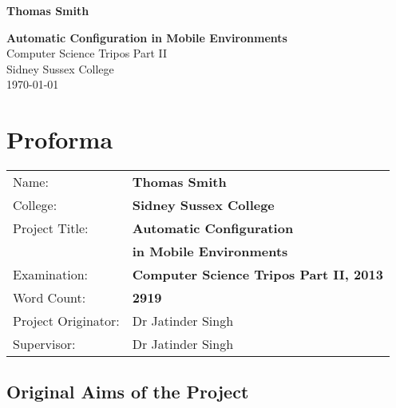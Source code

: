 \documentclass[12pt,twoside,notitlepage]{report}
\begin{document}





\pagestyle{empty}

\hfill{\LARGE \bf Thomas Smith}

\vspace*{60mm}
\begin{center}
\Huge
{\bf Automatic Configuration in Mobile Environments} \\
\vspace*{5mm}
Computer Science Tripos Part II \\
\vspace*{5mm}
Sidney Sussex College \\
\vspace*{5mm}
\today  %
\end{center}

\cleardoublepage


\setcounter{page}{1}
\pagestyle{plain}

\chapter*{Proforma}

{\large
\begin{tabular}{ll}
Name:               & \bf Thomas Smith	\\
College:            & \bf Sidney Sussex College	\\
Project Title:      & \bf Automatic Configuration \\ &\bf in Mobile Environments	\\
Examination:        & \bf Computer Science Tripos Part II, 2013 	\\
Word Count:         & \bf 2919\footnotemark[1] \\
Project Originator: & Dr Jatinder Singh		\\
Supervisor:         & Dr Jatinder Singh		\\ 
\end{tabular}
}



\section*{Original Aims of the Project}
\end{document}
